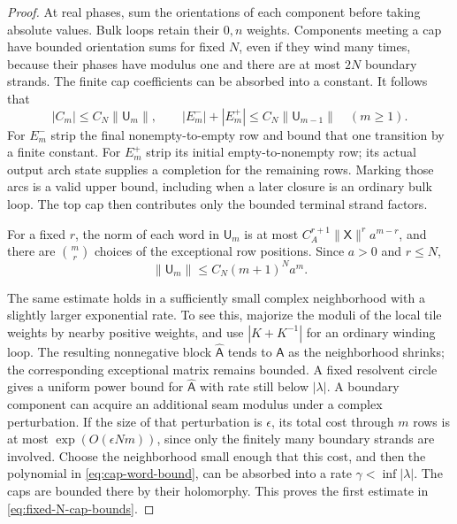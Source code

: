 \begin{proof}
At real phases, sum the orientations of each component before taking absolute values. Bulk loops retain their \(0,n\) weights. Components meeting a cap have bounded orientation sums for fixed \(N\), even if they wind many times, because their phases have modulus one and there are at most \(2N\) boundary strands. The finite cap coefficients can be absorbed into a constant. It follows that
\[
 |C_m|\le C_N\|\mathsf U_m\|,\qquad
 |E^-_m|+|E^+_m|\le C_N\|\mathsf U_{m-1}\|
 \quad(m\ge1).
\]
For \(E^-_m\) strip the final nonempty-to-empty row and bound that one transition by a finite constant. For \(E^+_m\) strip its initial empty-to-nonempty row; its actual output arch state supplies a completion for the remaining rows. Marking those arcs is a valid upper bound, including when a later closure is an ordinary bulk loop. The top cap then contributes only the bounded terminal strand factors.

For a fixed \(r\), the norm of each word in \(\mathsf U_m\) is at most
\(C_A^{r+1}\|\mathsf X\|^r a^{m-r}\), and there are \(\binom mr\) choices of the exceptional row positions. Since \(a>0\) and \(r\le N\),
\begin{equation}\label{eq:cap-word-bound}
 \|\mathsf U_m\|\le C_N(m+1)^N a^m .
\end{equation}

The same estimate holds in a sufficiently small complex neighborhood with a slightly larger exponential rate. To see this, majorize the moduli of the local tile weights by nearby positive weights, and use \(|K+K^{-1}|\) for an ordinary winding loop. The resulting nonnegative block \(\widehat{\mathsf A}\) tends to \(\mathsf A\) as the neighborhood shrinks; the corresponding exceptional matrix remains bounded. A fixed resolvent circle gives a uniform power bound for \(\widehat{\mathsf A}\) with rate still below \(|\lambda|\). A boundary component can acquire an additional seam modulus under a complex perturbation. If the size of that perturbation is \(\epsilon\), its total cost through \(m\) rows is at most \(\exp(O(\epsilon Nm))\), since only the finitely many boundary strands are involved. Choose the neighborhood small enough that this cost, and then the polynomial in \eqref{eq:cap-word-bound}, can be absorbed into a rate \(\gamma<\inf|\lambda|\). The caps are bounded there by their holomorphy. This proves the first estimate in \eqref{eq:fixed-N-cap-bounds}.


\end{proof}
